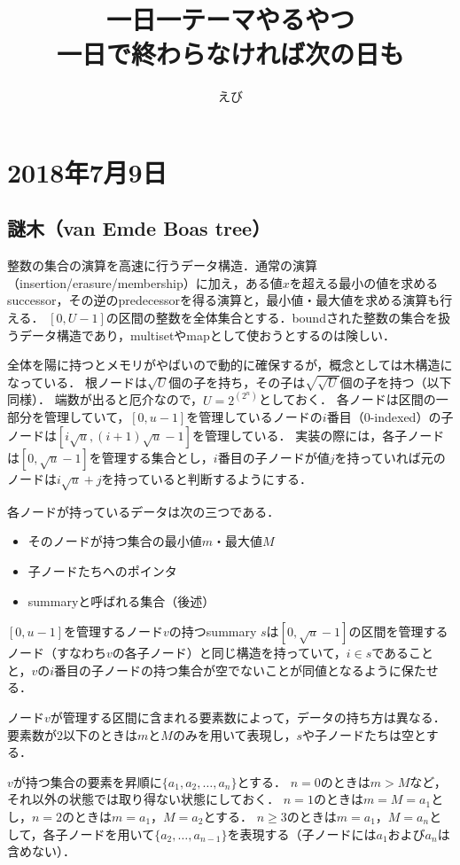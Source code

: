 \documentclass[a4paper]{jsarticle}
\title{
  {\Huge 一日一テーマやるやつ}\\
  {\Large 一日で終わらなければ次の日も}
}
\author{
  えび
}
\begin{document}
\maketitle


\section{2018年7月9日}
\subsection{謎木（van Emde Boas tree）}

整数の集合の演算を高速に行うデータ構造．通常の演算（insertion/erasure/membership）に加え，ある値$x$を超える最小の値を求めるsuccessor，その逆のpredecessorを得る演算と，最小値・最大値を求める演算も行える．
$[0, U-1]$の区間の整数を全体集合とする．boundされた整数の集合を扱うデータ構造であり，multisetやmapとして使おうとするのは険しい．

全体を陽に持つとメモリがやばいので動的に確保するが，概念としては木構造になっている．
根ノードは$\sqrt{U}$個の子を持ち，その子は$\sqrt{\sqrt{U}}$個の子を持つ（以下同様）．
端数が出ると厄介なので，$U=2^{(2^n)}$としておく．
各ノードは区間の一部分を管理していて，$[0, u-1]$を管理しているノードの$i$番目（0-indexed）の子ノードは$[i\sqrt{u}, (i+1)\sqrt{u}-1]$を管理している．
実装の際には，各子ノードは$[0, \sqrt{u}-1]$を管理する集合とし，$i$番目の子ノードが値$j$を持っていれば元のノードは$i\sqrt{u}+j$を持っていると判断するようにする．

各ノードが持っているデータは次の三つである．
\begin{itemize}
\item そのノードが持つ集合の最小値$m$・最大値$M$
\item 子ノードたちへのポインタ
\item summaryと呼ばれる集合（後述）
\end{itemize}
$[0, u-1]$を管理するノード$v$の持つsummary $s$は$[0, \sqrt{u}-1]$の区間を管理するノード（すなわち$v$の各子ノード）と同じ構造を持っていて，$i\in s$であることと，$v$の$i$番目の子ノードの持つ集合が空でないことが同値となるように保たせる．

ノード$v$が管理する区間に含まれる要素数によって，データの持ち方は異なる．
要素数が$2$以下のときは$m$と$M$のみを用いて表現し，$s$や子ノードたちは空とする．

$v$が持つ集合の要素を昇順に$\{a_1, a_2, \ldots, a_n\}$とする．
$n=0$のときは$m>M$など，それ以外の状態では取り得ない状態にしておく．
$n=1$のときは$m=M=a_1$とし，$n=2$のときは$m=a_1$，$M=a_2$とする．
$n\ge 3$のときは$m=a_1$，$M=a_n$として，各子ノードを用いて$\{a_2, \ldots, a_{n-1}\}$を表現する（子ノードには$a_1$および$a_n$は含めない）．
\end{document}
